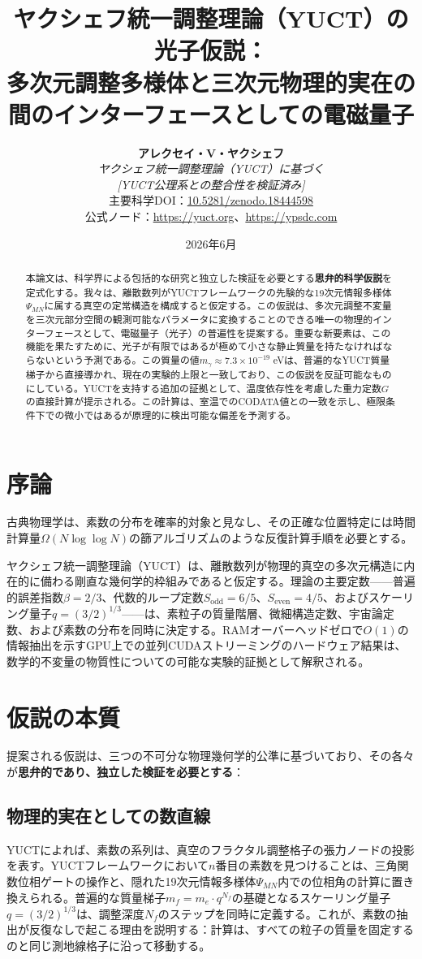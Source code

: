 \documentclass[11pt,a4paper]{article}
\title{\textbf{ヤクシェフ統一調整理論（YUCT）の光子仮説：\\
		多次元調整多様体と三次元物理的実在の\\
		間のインターフェースとしての電磁量子}}
\author{\textbf{アレクセイ・V・ヤクシェフ} \\
	\small\textit{ヤクシェフ統一調整理論（YUCT）に基づく} \\
	\small\textit{[YUCT公理系との整合性を検証済み]} \\
	\small 主要科学DOI：\href{https://doi.org/10.5281/zenodo.18444598}{10.5281/zenodo.18444598} \\
	\small 公式ノード：\url{https://yuct.org}、\url{https://ypsdc.com}}
\date{2026年6月}
\begin{document}
	
	\maketitle
	
	\begin{abstract}
		本論文は、科学界による包括的な研究と独立した検証を必要とする\textbf{思弁的科学仮説}を定式化する。我々は、離散数列がYUCTフレームワークの先験的な19次元情報多様体$\Psi_{MN}$に属する真空の定常構造を構成すると仮定する。この仮説は、多次元調整不変量を三次元部分空間の観測可能なパラメータに変換することのできる唯一の物理的インターフェースとして、電磁量子（光子）の普遍性を提案する。重要な新要素は、この機能を果たすために、光子が有限ではあるが極めて小さな静止質量を持たなければならないという予測である。この質量の値$m_\gamma \approx 7.3 \times 10^{-19}$ eVは、普遍的なYUCT質量梯子から直接導かれ、現在の実験的上限と一致しており、この仮説を反証可能なものにしている。YUCTを支持する追加の証拠として、温度依存性を考慮した重力定数$G$の直接計算が提示される。この計算は、室温でのCODATA値との一致を示し、極限条件下での微小ではあるが原理的に検出可能な偏差を予測する。
	\end{abstract}
	
	\section{序論}
	古典物理学は、素数の分布を確率的対象と見なし、その正確な位置特定には時間計算量$\Omega(N \log \log N)$の篩アルゴリズムのような反復計算手順を必要とする。
	
	ヤクシェフ統一調整理論（YUCT）は、離散数列が物理的真空の多次元構造に内在的に備わる剛直な幾何学的枠組みであると仮定する\cite{yuct_zenodo}。理論の主要定数——普遍的誤差指数$\beta = 2/3$、代数的ループ定数$S_{\mathrm{odd}} = 6/5$、$S_{\mathrm{even}} = 4/5$、およびスケーリング量子$q = (3/2)^{1/3}$——は、素粒子の質量階層、微細構造定数、宇宙論定数、および素数の分布を同時に決定する。RAMオーバーヘッドゼロで$O(1)$の情報抽出を示すGPU上での並列CUDAストリーミングのハードウェア結果は、数学的不変量の物質性についての可能な実験的証拠として解釈される。
	
	\section{仮説の本質}
	提案される仮説は、三つの不可分な物理幾何学的公準に基づいており、その各々が\textbf{思弁的であり、独立した検証を必要とする}：
	
	\subsection{物理的実在としての数直線}
	YUCTによれば、素数の系列は、真空のフラクタル調整格子の張力ノードの投影を表す。YUCTフレームワークにおいて$n$番目の素数を見つけることは、三角関数位相ゲートの操作と、隠れた19次元情報多様体$\Psi_{MN}$内での位相角の計算に置き換えられる。普遍的な質量梯子$m_f = m_e \cdot q^{N_f}$の基礎となるスケーリング量子$q = (3/2)^{1/3}$は、調整深度$N_f$のステップを同時に定義する。これが、素数の抽出が反復なしで起こる理由を説明する：計算は、すべての粒子の質量を固定するのと同じ測地線格子に沿って移動する。
	
\end{document}
